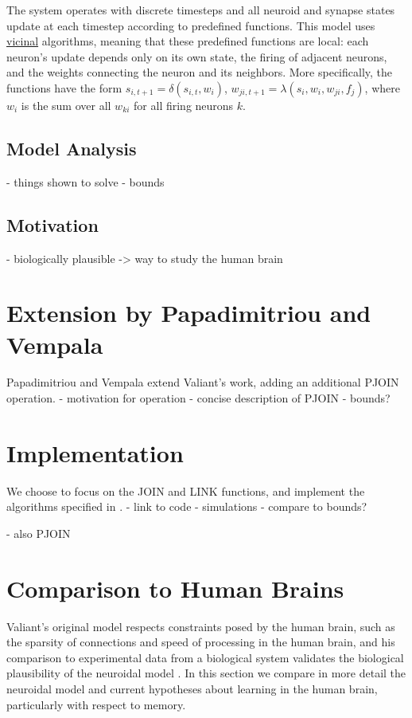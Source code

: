 \documentclass[letterpaper, 12pt]{article}
\begin{document}
The system operates with discrete timesteps and all neuroid and synapse states update at each timestep according to predefined functions. This model uses \underline{vicinal} algorithms, meaning that these predefined functions are local: each neuron's update depends only on its own state, the firing of adjacent neurons, and the weights connecting the neuron and its neighbors. More specifically, the functions have the form $s_{i,t+1}=\delta(s_{i,t},w_i)$, $w_{ji,t+1}=\lambda(s_i,w_i,w_{ji},f_j)$, where $w_i$ is the sum over all $w_{ki}$ for all firing neurons $k$.

\subsection{Model Analysis}
- things shown to solve
- bounds
\subsection*{Motivation}
- biologically plausible -> way to study the human brain


\section{Extension by Papadimitriou and Vempala}
Papadimitriou and Vempala \cite{papadimitriou_cortical_2015} extend Valiant's work, adding an additional PJOIN operation.
- motivation for operation
- concise description of PJOIN
- bounds?

\section{Implementation}
We choose to focus on the JOIN and LINK functions, and implement the algorithms specified in \cite{valiant_memorization_2005}.
- link to code
- simulations
- compare to bounds?

- also PJOIN

\section{Comparison to Human Brains}
Valiant's original model respects constraints posed by the human brain, such as the sparsity of connections and speed of processing in the human brain, and his comparison to experimental data from a biological system validates the biological plausibility of the neuroidal model \cite{valiant_quantitative_2006}. In this section we compare in more detail the neuroidal model and current hypotheses about learning in the human brain, particularly with respect to memory.
\end{document}
